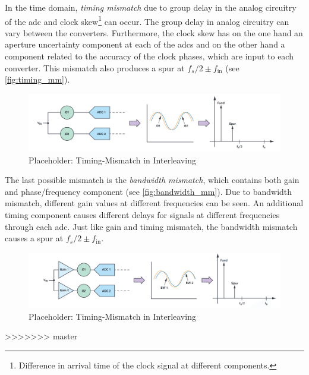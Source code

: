 In the time domain, \textit{timing mismatch} due to group delay in the analog circuitry of the \gls{adc} and clock skew\footnote{Difference in arrival time of the clock signal at different components.} can occur. The group delay in analog circuitry can vary between the converters. Furthermore, the clock skew has on the one hand an aperture uncertainty component at each of the \glspl{adc} and on the other hand a component related to the accuracy of the clock phases, which are input to each converter. \cite{Harris2019} This mismatch also produces a spur at $f_s/2 \pm f_{\text{in}}$ (see \autoref{fig:timing_mm}).

\begin{figure}[tbh]
	\centering
	\includegraphics[width = \textwidth]{chap/02-theory/img/timing_mm}
	\caption{Placeholder: Timing-Mismatch in Interleaving \cite{Harris2019}}
	\label{fig:timing_mm}
\end{figure}

The last possible mismatch is the \textit{bandwidth mismatch}, which contains both gain and phase/frequency component (see \autoref{fig:bandwidth_mm}). Due to bandwidth mismatch, different gain values at different frequencies can be seen. An additional timing component causes different delays for signals at different frequencies through each \gls{adc}. Just like gain and timing mismatch, the bandwidth mismatch causes a spur at $f_s/2 \pm f_{\text{in}}$.
\begin{figure}[tbh]
	\centering
	\includegraphics[width = \textwidth]{chap/02-theory/img/bandwidth_mm}
	\caption{Placeholder: Timing-Mismatch in Interleaving \cite{Harris2019}}
	\label{fig:bandwidth_mm}
\end{figure}
>>>>>>> master
